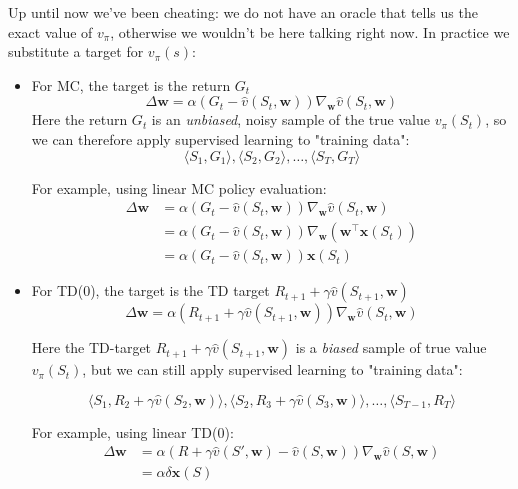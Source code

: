 Up until now we've been cheating: we do not have an oracle that tells us the exact value of $v_\pi$, otherwise we wouldn't be here talking right now. In practice we substitute a target for $v_\pi(s)$:
\begin{itemize}
    \item For MC, the target is the return $G_t$
    \[ 
        \Delta \mathbf{w} = \alpha \left( G_t - \hat{v}(S_t, \mathbf{w})\right) \nabla_{\mathbf{w}} \hat{v}(S_t, \mathbf{w})
    \]
    Here the return $G_t$ is an \emph{unbiased}, noisy sample of the true value $v_\pi(S_t)$, so we can therefore apply supervised learning to "training data":
    \[
        \langle S_1, G_1 \rangle, \langle S_2, G_2 \rangle, \dots, \langle S_T, G_T \rangle
    \]

    For example, using linear MC policy evaluation:
    \begin{align*}
        \Delta \mathbf{w} &= \alpha \left( G_t - \hat{v}(S_t, \mathbf{w}) \right) \nabla_{\mathbf{w}} \hat{v}(S_t, \mathbf{w}) \\
        &= \alpha \left( G_t - \hat{v}(S_t, \mathbf{w}) \right) \nabla_{\mathbf{w}} ( \mathbf{w}^\top \mathbf{x}(S_t) ) \\
        &= \alpha \left( G_t - \hat{v}(S_t, \mathbf{w})\right)  \mathbf{x}(S_t) 
    \end{align*}

    \item For TD(0), the target is the TD target $R_{t+1} + \gamma \hat{v}(S_{t+1}, \mathbf{w})$
    \[
        \Delta \mathbf{w} = \alpha \left( R_{t+1} + \gamma \hat{v}(S_{t+1}, \mathbf{w}) \right) \nabla_{\mathbf{w}} \hat{v}(S_t, \mathbf{w})
    \]

    Here the TD-target $R_{t+1} + \gamma \hat{v}(S_{t+1}, \mathbf{w})$ is a \emph{biased} sample of true value $v_\pi(S_t)$, but we can still apply supervised learning to "training data":

    $$
    \langle S_1, R_2 + \gamma \hat{v}(S_2, \mathbf{w})\rangle, \langle S_2, R_3 + \gamma \hat{v}(S_3, \mathbf{w})\rangle, \dots, \langle S_{T-1}, R_T \rangle
    $$

    For example, using linear TD(0):
    $$
    \begin{aligned} 
        \Delta \mathbf{w} &= \alpha \left( R + \gamma \hat{v}(S', \mathbf{w}) - \hat{v}(S, \mathbf{w}) \right) \nabla_{\mathbf{w}} \hat{v}(S, \mathbf{w}) \\ &= \alpha \delta \mathbf{x}(S) 
    \end{aligned}
    $$
\end{itemize}

